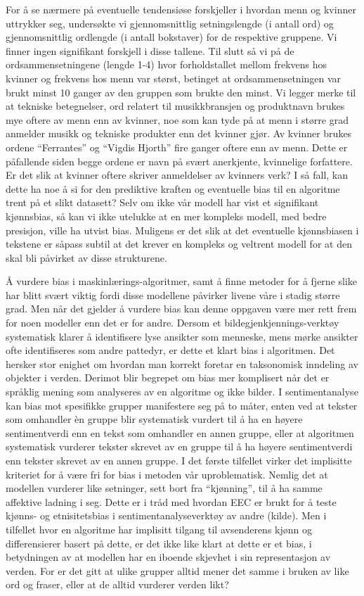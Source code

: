 \documentclass[11pt, a4paper]{article}
\begin{document}
For å se nærmere på eventuelle tendensiøse forskjeller i hvordan menn og kvinner uttrykker seg, undersøkte vi gjennomsnittlig setningslengde (i antall ord) og gjennomsnittlig ordlengde (i antall bokstaver) for de respektive gruppene. Vi finner ingen signifikant forskjell i disse tallene. Til slutt så vi på de ordsammensetningene (lengde 1-4) hvor forholdstallet mellom frekvens hos kvinner og frekvens hos menn var størst, betinget at ordsammensetningen var brukt minst 10 ganger av den gruppen som brukte den minst. Vi legger merke til at tekniske betegnelser, ord relatert til musikkbransjen og produktnavn brukes mye oftere av menn enn av kvinner, noe som kan tyde på at menn i større grad anmelder musikk og tekniske produkter enn det kvinner gjør. Av kvinner brukes ordene “Ferrantes” og “Vigdis Hjorth” fire ganger oftere enn av menn. Dette er påfallende siden begge ordene er navn på svært anerkjente, kvinnelige forfattere. Er det slik at kvinner oftere skriver anmeldelser av kvinners verk? I så fall, kan dette ha noe å si for den prediktive kraften og eventuelle bias til en algoritme trent på et slikt datasett? Selv om ikke vår modell har vist et signifikant kjønnsbias, så kan vi ikke utelukke at en mer kompleks modell, med bedre presisjon, ville ha utvist bias. Muligens er det slik at det eventuelle kjønnsbiasen i tekstene er såpass subtil at det krever en kompleks og veltrent modell for at den skal bli påvirket av disse strukturene.

Å  vurdere bias i maskinlærings-algoritmer, samt å finne metoder for å fjerne slike har blitt svært viktig fordi disse modellene påvirker livene våre i stadig større grad. Men når det gjelder å vurdere bias kan denne oppgaven være mer rett frem for noen modeller enn det er for andre. Dersom et bildegjenkjennings-verktøy systematisk klarer å identifisere lyse ansikter som menneske, mens mørke ansikter ofte identifiseres som andre pattedyr, er dette et klart bias i algoritmen. Det hersker stor enighet om hvordan man korrekt foretar en taksonomisk inndeling av objekter i verden. Derimot blir begrepet om bias mer komplisert når det er språklig mening som analyseres av en algoritme og ikke bilder. I sentimentanalyse kan bias mot spesifikke grupper manifestere seg på to måter, enten ved at tekster som omhandler èn gruppe blir systematisk vurdert til å ha en høyere sentimentverdi enn en tekst som omhandler en annen gruppe, eller at algoritmen systematisk vurderer tekster skrevet av en gruppe til å ha høyere sentimentverdi enn tekster skrevet av en annen gruppe. I det første tilfellet virker det implisitte kriteriet for å være fri for bias i metoden vår uproblematisk. Nemlig det at modellen vurderer like setninger, sett bort fra “kjønning”, til å ha samme affektive ladning i seg. Dette er i tråd med hvordan EEC er brukt for å teste kjønns- og etnisitetsbias i sentimentanalyseverktøy av andre (kilde).  Men i tilfellet hvor en algoritme har implisitt tilgang til avsenderens kjønn og differensierer basert på dette, er det ikke like klart at dette er et bias, i betydningen av at modellen har en iboende skjevhet i sin representasjon av verden. For er det gitt at ulike grupper alltid mener det samme i bruken av like ord og fraser, eller at de alltid vurderer verden likt?
\end{document}
